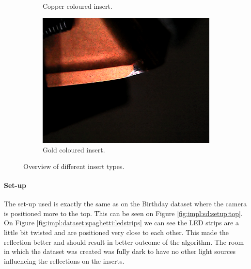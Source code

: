 \begin{figure}[hbtp]
\begin{subfigure}{0.31\textwidth}
		\caption{Copper coloured insert.}
		\label{fig:impl:datasets:spaghetti:copper}
	\end{subfigure}
	\hspace*{\fill}
	\begin{subfigure}{0.31\textwidth}
		\includegraphics[width=\linewidth, keepaspectratio=true]{./fig/Vision/Dataset/automated_datasets/2_created_datasets/2_Spaghetti_dataset/rounded_gold_b_015_p_006_l_006-011_white_nb.png}
		\caption{Gold coloured insert.}
		\label{fig:impl:datasets:spaghetti:gold}
	\end{subfigure}
	\hspace*{\fill}
	\caption{Overview of different insert types.}
	\label{fig:impl:datasets:spaghetti:types}
\end{figure}

\paragraph{Set-up}

The set-up used is exactly the same as on the Birthday dataset where the camera is positioned more to the top. This can be seen on Figure \ref{fig:impl:sd:setup:top}.
On Figure \ref{fig:impl:dataset:spaghetti:ledstrips} we can see the LED strips are a little bit twisted and are positioned very close to each other. This made the reflection better and should result in better outcome of the algorithm. The room in which the dataset was created was fully dark to have no other light sources influencing the reflections on the inserts.

